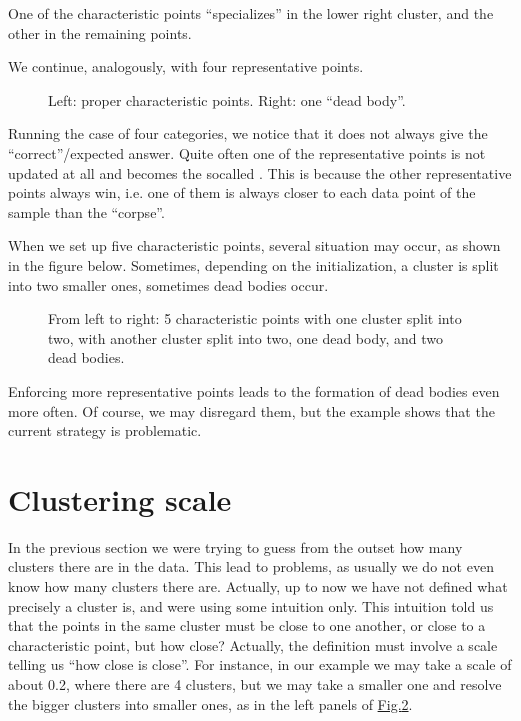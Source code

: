 \documentclass[letterpaper,10pt,english]{jupyterBook}
\let\sphinxpxdimen\pdfpxdimen\else\newdimen\sphinxpxdimen
\begin{document}
\noindent{}

\sphinxAtStartPar
One of the characteristic points “specializes” in the lower right cluster, and the other in the remaining points.

\sphinxAtStartPar
We continue, analogously, with four representative points.

\begin{figure}[htbp]
\centering
\capstart

\noindent\sphinxincludegraphics[width=500\sphinxpxdimen]{{cl4_2}.jpg}
\caption{Left: proper characteristic points. Right: one “dead body”.}\label{\detokenize{docs/unsupervised:p-fig}}\end{figure}

\sphinxAtStartPar
Running the case of four categories, we notice that it does not always give the “correct”/expected answer. Quite often one of the representative points is not updated at all and becomes the so\sphinxhyphen{}called . This is because the other representative points always win, i.e. one of them is always closer to each data point of the sample than the “corpse”.

\sphinxAtStartPar
When we set up five characteristic points, several situation may occur, as shown in the figure below. Sometimes, depending on the initialization, a cluster is split into two smaller ones, sometimes dead bodies occur.

\begin{figure}[htbp]
\centering
\capstart

\noindent\sphinxincludegraphics[width=870\sphinxpxdimen]{{cl5}.jpg}
\caption{From left to right: 5 characteristic points with one cluster split into two, with another cluster split into two, one dead body, and two dead bodies.}\label{\detokenize{docs/unsupervised:id1}}\end{figure}

\sphinxAtStartPar
Enforcing more representative points leads to the formation of dead bodies even more often. Of course, we may disregard them, but the example shows that the current strategy is problematic.


\section{Clustering scale}
\label{\detokenize{docs/unsupervised:clustering-scale}}
\sphinxAtStartPar
In the previous section we were trying to guess from the outset how many clusters there are in the data. This lead to problems, as usually we do not even know how many clusters there are. Actually, up to now we have not defined what precisely a cluster is, and were using some intuition only. This intuition told us that the points in the same cluster must be close to one another, or close to a characteristic point, but how close? Actually, the definition must involve a scale telling us “how close is close”. For instance, in our example we may take a scale of about 0.2, where there are 4 clusters, but we may take a smaller one and resolve the bigger clusters into smaller ones, as in the  left panels of \hyperref[\detokenize{docs/unsupervised:id1}]{Fig.\@ \ref{\detokenize{docs/unsupervised:id1}}}.
\end{document}
